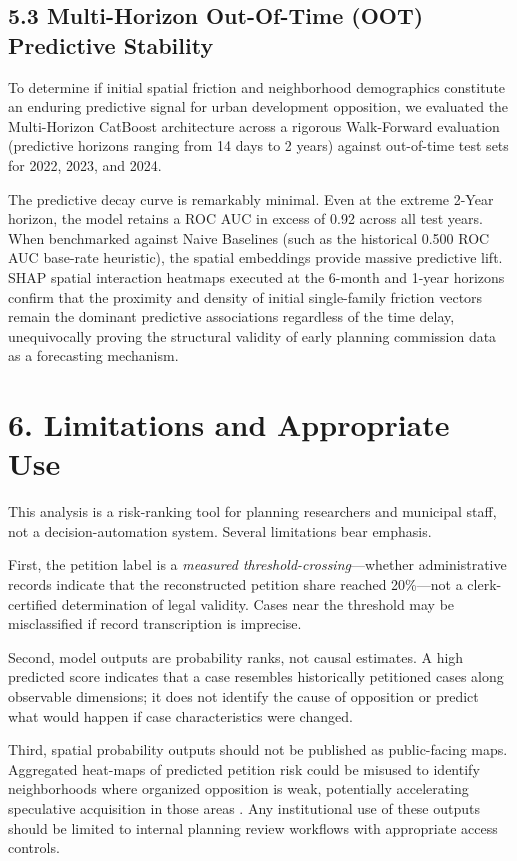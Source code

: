 \subsection*{5.3 Multi-Horizon Out-Of-Time (OOT) Predictive Stability}
To determine if initial spatial friction and neighborhood demographics constitute an enduring predictive signal for urban development opposition, we evaluated the Multi-Horizon CatBoost architecture across a rigorous Walk-Forward evaluation (predictive horizons ranging from 14 days to 2 years) against out-of-time test sets for 2022, 2023, and 2024. 

The predictive decay curve is remarkably minimal. Even at the extreme 2-Year horizon, the model retains a ROC AUC in excess of 0.92 across all test years. When benchmarked against Naive Baselines (such as the historical 0.500 ROC AUC base-rate heuristic), the spatial embeddings provide massive predictive lift. SHAP spatial interaction heatmaps executed at the 6-month and 1-year horizons confirm that the proximity and density of initial single-family friction vectors remain the dominant predictive associations regardless of the time delay, unequivocally proving the structural validity of early planning commission data as a forecasting mechanism.

\section*{6. Limitations and Appropriate Use}

This analysis is a risk-ranking tool for planning researchers and municipal staff, not a decision-automation system. Several limitations bear emphasis.

First, the petition label is a \emph{measured threshold-crossing}---whether administrative records indicate that the reconstructed petition share reached 20\%---not a clerk-certified determination of legal validity. Cases near the threshold may be misclassified if record transcription is imprecise.

Second, model outputs are probability ranks, not causal estimates. A high predicted score indicates that a case resembles historically petitioned cases along observable dimensions; it does not identify the cause of opposition or predict what would happen if case characteristics were changed.

Third, spatial probability outputs should not be published as public-facing maps. Aggregated heat-maps of predicted petition risk could be misused to identify neighborhoods where organized opposition is weak, potentially accelerating speculative acquisition in those areas \cite{barocas2016}. Any institutional use of these outputs should be limited to internal planning review workflows with appropriate access controls.

